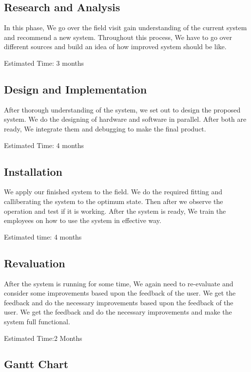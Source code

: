 \documentclass[12pt]{article}
\begin{document}
\subsection{Research and Analysis}
In this phase, We go over the field visit gain understanding of the current system and recommend a new system.
Throughout this process, We have to go over different sources and build an idea of how improved system should be like.\par
Estimated Time: 3 months
\subsection{Design and Implementation}
After thorough understanding of the system, we set out to design the proposed system.
We do the designing of hardware and software in parallel.
After both are ready, We integrate them and debugging to make the final product.\par
Estimated Time: 4 months
\subsection{Installation}
We apply our finished system to the field.
We do the required fitting and calliberating the system to the optimum state.
Then after we observe the operation and test if it is working.
After the system is ready, We train the employees on how to use the system in effective way.\par
Estimated time: 4 months
\subsection{Revaluation}
After the system is running for some time, We again need to re-evaluate and consider some improvements based upon the feedback of the user. We get the feedback and do the necessary improvements based upon the feedback of the user. We get the feedback and do the necessary improvements and make the system full functional.\par
Estimated Time:2 Months

\subsection{Gantt Chart}

\newpage
\end{document}
